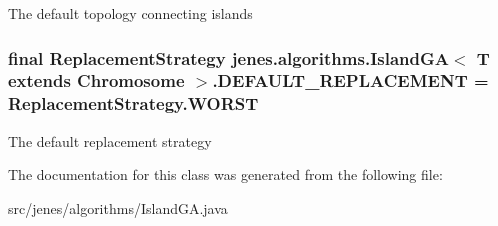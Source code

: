 The default topology connecting islands \hypertarget{classjenes_1_1algorithms_1_1_island_g_a_3_01_t_01extends_01_chromosome_01_4_1fc6944fd99215488896c76893d5f3d0}{
\subsubsection[DEFAULT\_\-REPLACEMENT]{\setlength{\rightskip}{0pt plus 5cm}final {\bf ReplacementStrategy} jenes.algorithms.IslandGA$<$ T extends Chromosome $>$.{\bf DEFAULT\_\-REPLACEMENT} = ReplacementStrategy.WORST}}
\label{classjenes_1_1algorithms_1_1_island_g_a_3_01_t_01extends_01_chromosome_01_4_1fc6944fd99215488896c76893d5f3d0}


The default replacement strategy 

The documentation for this class was generated from the following file:\begin{CompactItemize}
\item 
src/jenes/algorithms/IslandGA.java\end{CompactItemize}
